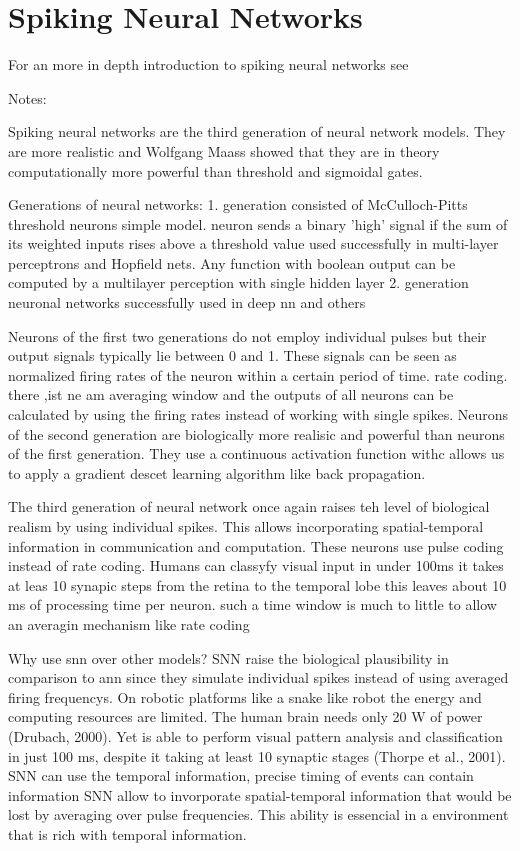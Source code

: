 \chapter{Spiking Neural Networks}
\label{section:snn}

For an more in depth introduction to spiking neural networks see \cite{Vreeken2003}

Notes:




Spiking neural networks are the third generation of neural network models. They are more realistic and Wolfgang Maass showed that they are in theory computationally more powerful than threshold and sigmoidal gates\cite{Maass1997}.

Generations of neural networks:
1. generation consisted of McCulloch-Pitts threshold neurons
simple model. neuron sends a binary 'high' signal if the sum of its weighted inputs rises above a threshold value
used successfully in multi-layer perceptrons and Hopfield nets. Any function with boolean output can be computed by a multilayer perception with single hidden layer
2. generation neuronal networks
successfully used in deep nn and others

Neurons of the first two generations do not employ individual pulses but their output signals typically lie between 0 and 1. These signals can be seen as normalized firing rates of the neuron within a certain period of time. rate coding. there ,ist ne am averaging window and the outputs of all neurons can be calculated by using the firing rates instead of working with single spikes. Neurons of the second generation are biologically more realisic and powerful than neurons of the first generation. They use a continuous activation function withc allows us to apply a gradient descet learning algorithm like back propagation.

The third generation of neural network once again raises teh level of biological realism by using individual spikes. This allows incorporating spatial-temporal information in communication and computation. These neurons use pulse coding instead of rate coding. Humans can classyfy visual input in under 100ms it takes at leas 10 synapic steps from the retina to the temporal lobe this leaves about 10 ms of processing time per neuron. such a time window is much to little to allow an averagin mechanism like rate coding

Why use snn over other models?
SNN raise the biological plausibility in comparison to ann since they simulate individual spikes instead of using averaged firing frequencys.
On robotic platforms like a snake like robot the energy and computing resources are limited. The human brain needs only 20 W of power  (Drubach, 2000). Yet is able to perform visual pattern analysis and classification in just 100 ms, despite it taking at least 10 synaptic stages (Thorpe et al., 2001).
SNN can use the temporal information, precise timing of events can contain information
SNN allow to invorporate spatial-temporal information that would be lost by averaging over pulse frequencies. This ability is essencial in a environment that is rich with temporal information. 

